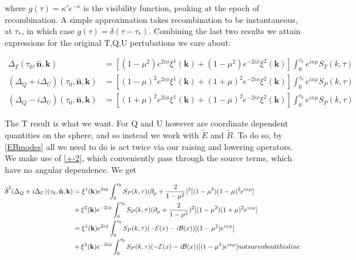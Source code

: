 \documentclass[a4paper,10pt]{article}
\renewcommand{\v}[1]{\mathbf{#1}}
\newcommand{\unit}[1]{\hat{\v{#1}}}
\renewcommand{\sl}{\bar{\text{\normalfont\dh}}}
\begin{document}
where $g(\tau) = \kappa'e^{-\kappa}$ is the visibility function, peaking at the epoch of recombination. A simple approximation takes recombination to be instantaneous, at $\tau_*$, in which case $g(\tau) = \delta(\tau-\tau_*)$. Combining the last two results we attain expressions for the original T,Q,U pertubations we care about:



\begin{equation}\begin{split}
\Delta_T(\tau_0,\unit{n},\v{k}) &= [(1-\mu^2) e^{2i\phi} \xi^1(\v{k})+(1-\mu^2) e^{-2i\phi} \xi^2(\v{k})]\int_0^{\tau_0} e^{ix\mu}S_T(k,\tau)\\
(\Delta_Q+i\Delta_U)(\tau_0,\unit{n},\v{k}) &=[(1-\mu)^2 e^{2i\phi} \xi^1(\v{k})+(1+\mu)^2 e^{-2i\phi} \xi^2(\v{k})]\int_0^{\tau_0} e^{ix\mu}S_P(k,\tau)\\
(\Delta_Q-i\Delta_U)(\tau_0,\unit{n},\v{k}) &=[(1+\mu)^2 e^{2i\phi} \xi^1(\v{k})+(1-\mu)^2 e^{-2i\phi} \xi^2(\v{k})]\int_0^{\tau_0} e^{ix\mu}S_P(k,\tau)
\end{split}\end{equation}



The T result is what we want. For Q and U however are coordinate dependent quantities on the sphere, and so instead we work with $\tilde{E}$ and $\tilde{B}$. To do so, by \ref{EBmodes} all we need to do is act twice via our raising and lowering operators. We make use of \ref{+-2}, which conveniently pass through the source terms, which have no angular dependence. We get

\begin{equation}\begin{split}
\sl^2(\Delta_Q+i\Delta_U)(\tau_0,\unit{n},\v{k}) &= \xi^1(\v{k})e^{2i\phi}\int_0^{\tau_0}S_P(k,\tau)(\partial_\mu+\frac{2}{1-\mu^2})^2[(1-\mu^2)(1-\mu)^2 e^{ix\mu}]\\
&{} + \xi^2(\v{k})e^{-2i\phi}\int_0^{\tau_0}S_P(k,\tau)(\partial_\mu+\frac{2}{1-\mu^2})^2[(1-\mu^2)(1+\mu)^2 e^{ix\mu}]\\
&= \xi^1(\v{k})e^{2i\phi}\int_0^{\tau_0}S_P(k,\tau)(-\mathcal{E}(x)-i\mathcal{B}(x))[(1-\mu^2) e^{ix\mu}] \\
&{} + \xi^2(\v{k})e^{-2i\phi}\int_0^{\tau_0}S_P(k,\tau)(-\mathcal{E}(x)-i\mathcal{B}(x))[(1-\mu^2) e^{ix\mu}] not sure about this line
\end{split}\end{equation}
\end{document}
